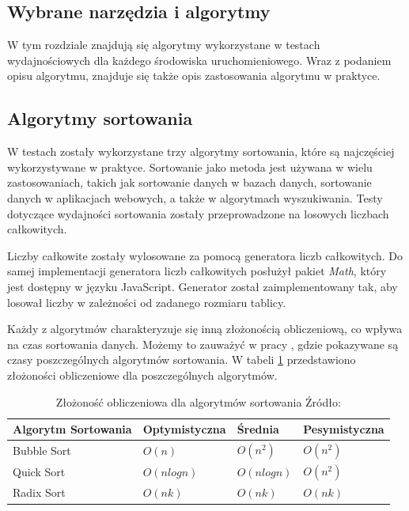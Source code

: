 \subsection{Wybrane narzędzia i algorytmy}
W tym rozdziale znajdują się algorytmy wykorzystane w testach wydajnościowych dla każdego środowiska uruchomieniowego. Wraz z podaniem opisu algorytmu, znajduje się także opis zastosowania algorytmu w praktyce.

\subsection{Algorytmy sortowania}
W testach zostały wykorzystane trzy algorytmy sortowania, które są najczęściej wykorzystywane w praktyce. Sortowanie jako metoda jest używana w wielu zastosowaniach, takich jak sortowanie danych w bazach danych, sortowanie danych w aplikacjach webowych, a także w algorytmach wyszukiwania. Testy dotyczące wydajności sortowania zostały przeprowadzone na losowych liczbach całkowitych.

Liczby całkowite zostały wylosowane za pomocą generatora liczb całkowitych. Do samej implementacji generatora liczb całkowitych posłużył pakiet \textit{Math}, który jest dostępny w języku JavaScript. Generator został zaimplementowany tak, aby losował liczby w zależności od zadanego rozmiaru tablicy.

Każdy z algorytmów charakteryzuje się inną złożonością obliczeniową, co wpływa na czas sortowania danych. Możemy to zauważyć w pracy \cite{sorting}, gdzie pokazywane są czasy poszczególnych algorytmów sortowania. W tabeli \ref{tab:sorting_complexity} przedstawiono złożoności obliczeniowe dla poszczególnych algorytmów.

\begin{table}[H]
  \centering
  \caption{Złożoność obliczeniowa dla algorytmów sortowania Źródło: \cite{sorting}}
  \begin{tabular}{|l|l|l|l|}
  \hline
  \textbf{Algorytm Sortowania} & \textbf{Optymistyczna} & \textbf{Średnia} & \textbf{Pesymistyczna} \\ \hline
    Bubble Sort & $O(n)$ & $O(n^2)$ & $O(n^2)$ \\ 
    \hline
    Quick Sort & $O(n log n)$ & $O(n log n)$ & $O(n^2)$ \\ 
    \hline
    Radix Sort & $O(nk)$ & $O(nk)$ & $O(nk)$ \\
    \hline
  \end{tabular}
  \label{tab:sorting_complexity}
\end{table}

